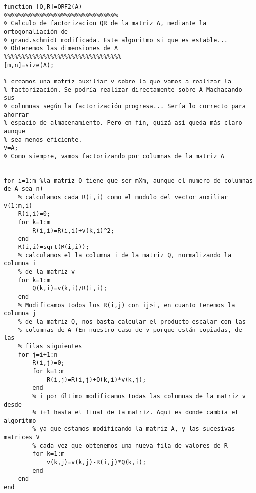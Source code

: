 \begin{lstlisting}
function [Q,R]=QRF2(A)
%%%%%%%%%%%%%%%%%%%%%%%%%%%%%%%%
% Calculo de factorizacion QR de la matriz A, mediante la ortogonaliación de
% grand.schmidt modificada. Este algoritmo si que es estable...
% Obtenemos las dimensiones de A
%%%%%%%%%%%%%%%%%%%%%%%%%%%%%%%%%
[m,n]=size(A);

% creamos una matriz auxiliar v sobre la que vamos a realizar la
% factorización. Se podría realizar directamente sobre A Machacando sus
% columnas según la factorización progresa... Sería lo correcto para ahorrar
% espacio de almacenamiento. Pero en fin, quizá así queda más claro aunque
% sea menos eficiente.
v=A;
% Como siempre, vamos factorizando por columnas de la matriz A


for i=1:m %la matriz Q tiene que ser mXm, aunque el numero de columnas de A sea n)
    % calculamos cada R(i,i) como el modulo del vector auxiliar v(1:m,i)
    R(i,i)=0;
    for k=1:m
        R(i,i)=R(i,i)+v(k,i)^2;
    end
    R(i,i)=sqrt(R(i,i));
    % calculamos el la columna i de la matriz Q, normalizando la columna i
    % de la matriz v
    for k=1:m
        Q(k,i)=v(k,i)/R(i,i);
    end
    % Modificamos todos los R(i,j) con ij>i, en cuanto tenemos la columna j
    % de la matriz Q, nos basta calcular el producto escalar con las
    % columnas de A (En nuestro caso de v porque están copiadas, de las
    % filas siguientes
    for j=i+1:n
        R(i,j)=0;
        for k=1:m
            R(i,j)=R(i,j)+Q(k,i)*v(k,j);
        end
        % i por último modificamos todas las columnas de la matriz v desde
        % i+1 hasta el final de la matriz. Aqui es donde cambia el algoritmo
        % ya que estamos modificando la matriz A, y las sucesivas matrices V
        % cada vez que obtenemos una nueva fila de valores de R
        for k=1:m
            v(k,j)=v(k,j)-R(i,j)*Q(k,i);
        end
    end
end
\end{lstlisting}


